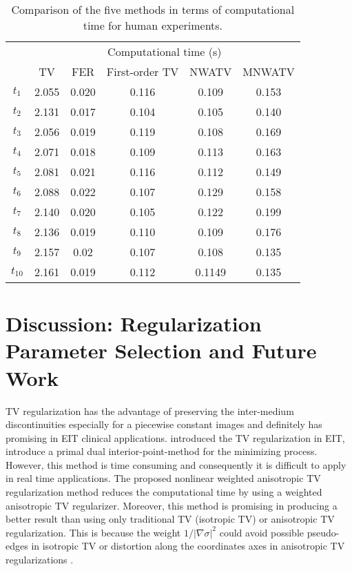 \documentclass[lettersize,journal]{IEEEtran}
\def\na{\nabla}
\begin{document}
\begin{table}[]
\centering
\caption{Comparison of the five methods in terms of computational time
for human experiments.}
\begin{tabular*}{8 cm}{@{\extracolsep{\fill}}cccccc}
\hline\hline
    & \multicolumn{5}{c}{Computational time (s)}                                                              \\ \cline{2-6}
 &      TV    & FER   & First-order TV   &  NWATV    & MNWATV \\ \hline
$t_1$    & 2.055 & 0.020 & 0.116 & 0.109  & 0.153   \\
$t_2$    & 2.131 & 0.017 & 0.104 & 0.105  & 0.140   \\
$t_3$    & 2.056 & 0.019 & 0.119 & 0.108  & 0.169   \\
$t_4$    & 2.071 & 0.018 & 0.109 & 0.113  & 0.163   \\
$t_5$    & 2.081 & 0.021 & 0.116 & 0.112  & 0.149   \\
$t_6$ & 2.088 & 0.022 & 0.107 & 0.129  & 0.158   \\
$t_7$ & 2.140 & 0.020 & 0.105 & 0.122  & 0.199   \\
$t_8$ & 2.136 & 0.019 & 0.110 & 0.109  & 0.176   \\
$t_9$ & 2.157 & 0.02  & 0.107 & 0.108  & 0.135   \\
$t_{10}$ & 2.161 & 0.019 & 0.112 & 0.1149 & 0.135   \\ \hline\hline
\end{tabular*}
\label{time_consumption}
\end{table}





\section{Discussion: Regularization Parameter Selection and Future Work}\label{section:discussion}


TV regularization has the advantage of preserving the inter-medium discontinuities \cite{Javaheriana2016} especially for a piecewise constant images and definitely has promising in EIT clinical applications. \cite{Dobson1994} introduced the TV regularization in EIT, \cite{Borsic2010} introduce a primal dual interior-point-method for the minimizing process. However, this method is time consuming and consequently it is difficult to apply in real time applications.
The proposed nonlinear weighted anisotropic TV regularization method reduces the computational time by using a weighted anisotropic TV regularizer. Moreover, this method is promising in producing a better result than using only traditional TV (isotropic TV) or anisotropic TV regularization. This is because the weight $1/|\na\sigma|^2$ could avoid possible pseudo-edges in isotropic TV or distortion along the coordinates axes in anisotropic TV regularizations \cite{Gonzalez2017}.
\end{document}
